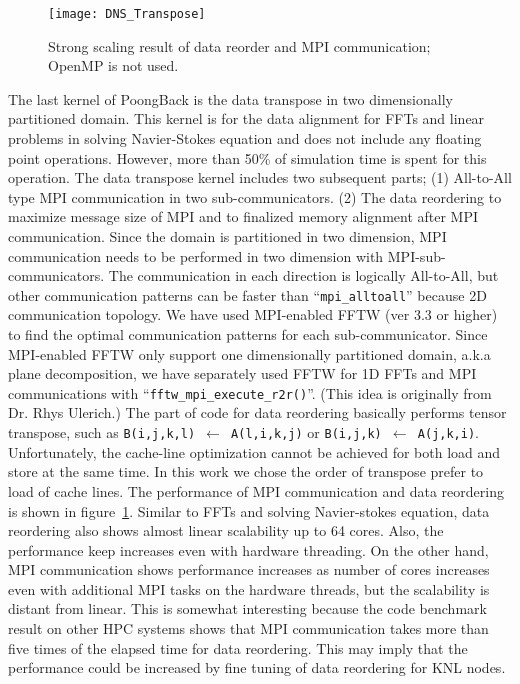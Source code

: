 \begin{figure}
 \begin{center}
   \texttt{[image: DNS\_Transpose]}
   \caption{Strong scaling result of data reorder and MPI communication; OpenMP is not used.}
   \label{fig:DNS_strong_scale_transpose}
 \end{center}
\end{figure}

The last kernel of PoongBack is the data transpose in two dimensionally partitioned domain. This kernel is for the data alignment for FFTs and linear problems in solving Navier-Stokes equation and does not include any floating point operations. However, more than 50\% of simulation time is spent for this operation. The data transpose kernel includes two subsequent parts; (1) All-to-All type MPI communication in two sub-communicators. (2) The data reordering to maximize message size of MPI and to finalized memory alignment after MPI communication. Since the domain is partitioned in two dimension, MPI communication needs to be performed in two dimension with MPI-sub-communicators. The communication in each direction is logically All-to-All, but other communication patterns can be faster than ``{\tt mpi\_alltoall}'' because 2D communication topology. We have used MPI-enabled FFTW (ver 3.3 or higher) to find the optimal communication patterns for each sub-communicator. Since MPI-enabled FFTW only support one dimensionally partitioned domain, a.k.a plane decomposition, we have separately used FFTW for 1D FFTs and MPI communications with ``{\tt fftw\_mpi\_execute\_r2r()}''. (This idea is originally from Dr. Rhys Ulerich.) The part of code for data reordering basically performs tensor transpose, such as {\tt B(i,j,k,l) $\leftarrow$ A(l,i,k,j)} or {\tt B(i,j,k) $\leftarrow$ A(j,k,i)}. Unfortunately, the cache-line optimization cannot be achieved for both load and store at the same time. In this work we chose the order of transpose prefer to load of cache lines. The performance of MPI communication and data reordering is shown in figure~\ref{fig:DNS_strong_scale_transpose}. Similar to FFTs and solving Navier-stokes equation, data reordering also shows almost linear scalability up to 64 cores. Also, the performance keep increases even with hardware threading. On the other hand, MPI communication shows performance increases as number of cores increases even with additional MPI tasks on the hardware threads, but the scalability is distant from linear. This is somewhat interesting because the code benchmark result on other HPC systems shows that MPI communication takes more than five times of the elapsed time for data reordering. \cite{Lee:2013kv} This may imply that the performance could be increased by fine tuning of data reordering for KNL nodes.

